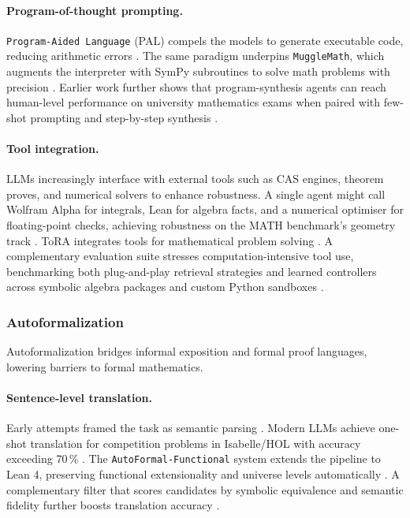 \documentclass[acmsmall,anonymous]{acmart}
\begin{document}
\paragraph{Program-of-thought prompting.}
\texttt{Program-Aided Language} (PAL) compels the models to generate executable code, reducing arithmetic errors \cite{chen2022program,gao2022pal}.  The same paradigm underpins \texttt{MuggleMath}, which augments the interpreter with SymPy subroutines to solve math problems with precision \cite{li2024mugglemath}.
Earlier work further shows that program-synthesis agents can reach human-level performance on university mathematics exams when paired with few-shot prompting and step-by-step synthesis \cite{drori-2022-program-synthesis}.

\paragraph{Tool integration.}
LLMs increasingly interface with external tools such as CAS engines, theorem proves, and numerical solvers to enhance robustness.  A single agent might call Wolfram Alpha for integrals, Lean for algebra facts, and a numerical optimiser for floating-point checks, achieving robustness on the MATH benchmark’s geometry track \cite{frieder2023mathematical}. ToRA integrates tools for mathematical problem solving \cite{gou2023}. A complementary evaluation suite stresses computation-intensive tool use, benchmarking both plug-and-play retrieval strategies and learned controllers across symbolic algebra packages and custom Python sandboxes \cite{zhang-2023-tool-aug}.

\subsubsection{Autoformalization}\label{sec:autoformal}
Autoformalization bridges informal exposition and formal proof languages, lowering barriers to formal mathematics.

\paragraph{Sentence-level translation.}
Early attempts framed the task as semantic parsing \cite{wang2018first}.  Modern LLMs achieve one-shot translation for competition problems in Isabelle/HOL with accuracy exceeding 70\,\% \cite{wu2022autoformalization}.  The \texttt{AutoFormal-Functional} system extends the pipeline to Lean 4, preserving functional extensionality and universe levels automatically \cite{buali2024towards}. A complementary filter that scores candidates by symbolic equivalence and semantic fidelity further boosts translation accuracy \cite{li2024symbolicautoformal}.
\end{document}
